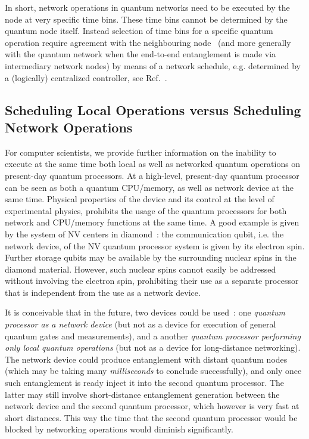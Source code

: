 In short, network operations in quantum networks need to be executed by the node at very specific time bins. These time bins cannot be determined by the quantum node itself. Instead selection of time bins for a specific quantum operation require agreement with the neighbouring node~\cite{dahlberg_2019_egp} (and more generally with the quantum network when the end-to-end entanglement is made via intermediary network nodes) by means of a network schedule, e.g. determined by a (logically) centralized controller, see Ref.~\cite{skrzypczyk_2021_arch}.

\subsection{Scheduling Local Operations versus Scheduling Network Operations}

For computer scientists, we provide further information on the inability to execute at the same time both local as well as networked quantum operations on present-day quantum processors. At a high-level, present-day quantum processor can be seen as both a quantum \ac{CPU}/memory, as well as network device at the same time. Physical properties of the device and its control at the level of experimental physics, prohibits the usage of the quantum processors for both network and \ac{CPU}/memory functions at the same time. A good example is given by the system of \ac{NV} centers in diamond~\cite{kalb_2017_entanglement,humphreys_2018_delivery}: the communication qubit, i.e. the network device, of the \ac{NV} quantum processor system is given by its electron spin. Further storage qubits may be available by the surrounding nuclear spins in the diamond material. However, such nuclear spins cannot easily be addressed without involving the electron spin, prohibiting their use as a separate processor that is independent from the use as a network device. 

It is conceivable that in the future, two devices could be used~\cite{vardoyan_2022_netarch}: one \emph{quantum processor as a network device} (but not as a device for execution of general quantum gates and measurements), and a another \emph{quantum processor performing only local quantum operations} (but not as a device for long-distance networking). The network device could produce entanglement with distant quantum nodes (which may be taking many \emph{milliseconds} to conclude successfully), and only once such entanglement is ready inject it into the second quantum processor. The latter may still involve short-distance entanglement generation between the network device and the second quantum processor, which however is very fast at short distances. This way the time that the second quantum processor would be blocked by networking operations would diminish significantly.

